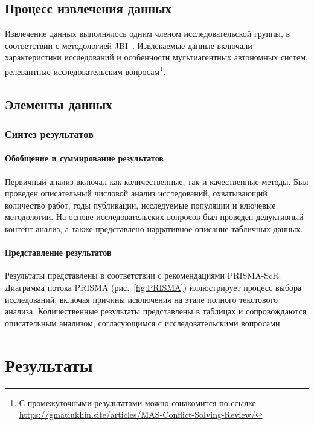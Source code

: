 \subsection{Процесс извлечения данных}

Извлечение данных выполнялось одним членом исследовательской группы,
в соответствии с методологией JBI~\cite{afc61c6cf471416489e36a4bc382d3b9}.
Извлекаемые данные включали характеристики исследований и особенности
мультиагентных автономных систем, релевантные исследовательским вопросам\footnote{С промежуточными результатами можно ознакомится по ссылке
\url{https://gmatiukhin.site/articles/MAS-Conflict-Solving-Review/}}.

\subsection{Элементы данных}

\subsubsection{Синтез результатов}

\paragraph{Обобщение и суммирование результатов}

Первичный анализ включал как количественные, так и качественные методы.
Был проведен описательный числовой анализ исследований, охватывающий
количество работ, годы публикации, исследуемые популяции и ключевые методологии.
На основе исследовательских вопросов был проведен дедуктивный контент-анализ,
а также представлено нарративное описание табличных данных.

\paragraph{Представление результатов}

Результаты представлены в соответствии с рекомендациями PRISMA-ScR.
Диаграмма потока PRISMA (рис.~\ref{fig:PRISMA}) иллюстрирует процесс выбора исследований,
включая причины исключения на этапе полного текстового анализа.
Количественные результаты представлены в таблицах и сопровождаются
описательным анализом, согласующимся с исследовательскими вопросами.

\section{Результаты}

